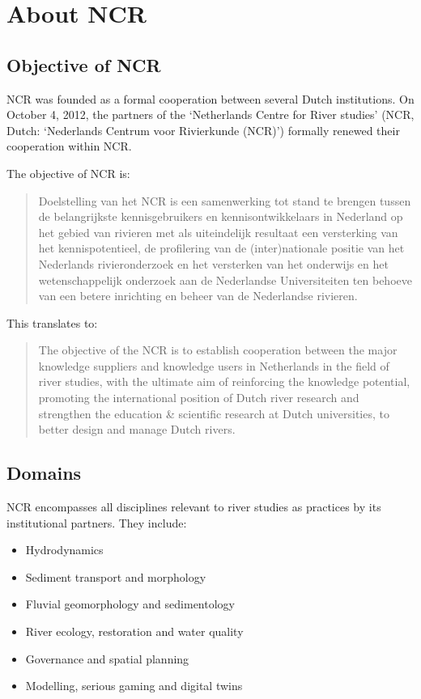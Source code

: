 \chapter{About NCR}
\begin{multicols}{2}

\section{Objective of NCR}
NCR was founded as a formal cooperation between several Dutch institutions. On October 4, 2012, the partners of the `Netherlands Centre for River studies' (NCR, Dutch: `Nederlands Centrum voor Rivierkunde (NCR)') formally renewed their cooperation within NCR.

The objective of NCR is:

\begin{quote}
Doelstelling van het NCR is een samenwerking tot stand te brengen tussen de belangrijkste kennisgebruikers en kennisontwikkelaars in Nederland op het gebied van rivieren met als uiteindelijk resultaat een versterking van het kennispotentieel, de profilering van de (inter)nationale positie van het Nederlands rivieronderzoek en het versterken van het onderwijs en het wetenschappelijk onderzoek aan de Nederlandse Universiteiten ten behoeve van een betere inrichting en beheer van de Nederlandse rivieren.
\end{quote}

This translates to:

\begin{quote}
The objective of the NCR is to establish cooperation between the major knowledge suppliers and knowledge users in Netherlands in the field of river studies, with the ultimate aim of reinforcing the knowledge potential, promoting the international position of Dutch river research and strengthen the education \& scientific research at Dutch universities, to better design and manage Dutch rivers.
\end{quote}

\section{Domains}
\label{section:domains}
NCR encompasses all disciplines relevant to river studies as practices by its institutional partners. They include:
\begin{itemize}
    \item Hydrodynamics
    \item Sediment transport and morphology
    \item Fluvial geomorphology and sedimentology
    \item River ecology, restoration and water quality
    \item Governance and spatial planning
    \item Modelling, serious gaming and digital twins
\end{itemize}



\end{multicols}
